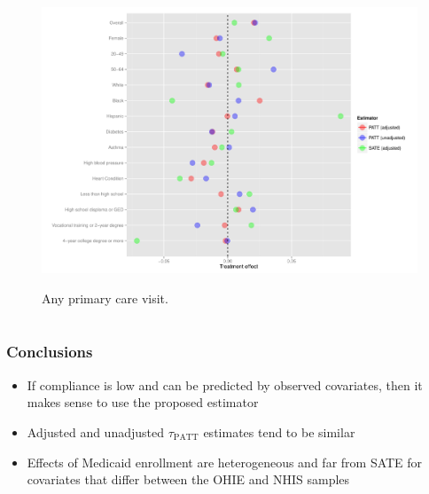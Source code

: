 \documentclass{beamer}
\begin{document}
\begin{frame}
\begin{figure}[htbp]
\begin{center}
    \caption{Any primary care visit.}
   \includegraphics[scale=0.35]{../paper/any-out-plot.pdf} 
   \label{het-plot-ao}
   \end{center}
\end{figure}
\end{frame}



\section[Conclusions]{}

\begin{frame}
\frametitle{Conclusions}
\begin{itemize}
\item If compliance is low and can be predicted by observed covariates, then it makes sense to use the proposed estimator 
\item Adjusted and unadjusted $\tau_{\text{PATT}}$ estimates tend to be similar
\item Effects of Medicaid enrollment are heterogeneous and far from SATE for covariates that differ between the OHIE and NHIS samples
\end{itemize}
\end{frame}

\section[References]{}
\end{document}
